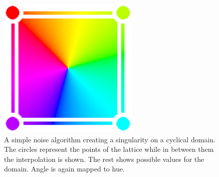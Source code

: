 \documentclass{utue} %
\begin{document}
\begin{figure}[h]
  \centering
  \includegraphics[width=0.45\linewidth]{images/simpleAlgo}
  \caption{A simple noise algorithm creating a singularity on a cyclical domain. The circles represent the points of the lattice while in between them the interpolation is shown. The rest shows possible values for the domain. Angle is again mapped to hue.}\label{fig:simpleAlgirithmSingularity}
\end{figure}
\end{document}

